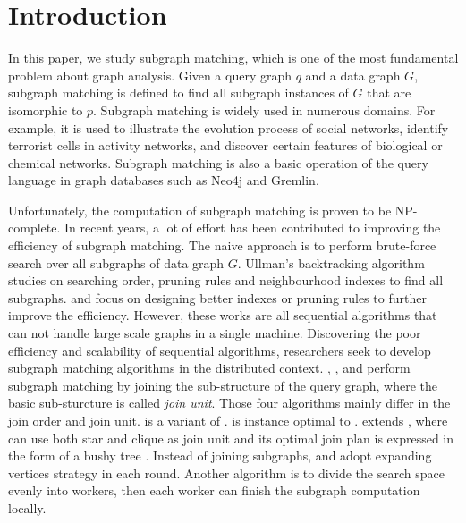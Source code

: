\section{Introduction}
\label{sec:intro}
In this paper, we study subgraph matching, which is one of the most fundamental problem about graph analysis. Given a query graph $q$ and a data graph $G$, subgraph matching is defined to find all subgraph instances of $G$ that are isomorphic to $p$. Subgraph matching is widely used in numerous domains. For example, it is used to illustrate the evolution process of social networks\cite{kairam2012life}, identify terrorist cells in activity networks\cite{cook2006mining}, and discover certain features of biological or chemical networks\cite{Cannataro2010}. Subgraph matching is also a basic operation of the query language in graph databases such as Neo4j\cite{neo4j} and Gremlin\cite{gremlin}.

 Unfortunately, the computation of subgraph matching is proven to be NP-complete\cite{Shamir97}. In recent years, a lot of effort has been contributed to improving the efficiency of subgraph matching. The naive approach is to perform brute-force search over all subgraphs of data graph $G$. Ullman's backtracking algorithm\cite{Ullmann1976} studies on searching order, pruning rules and neighbourhood indexes to find all subgraphs. \vftwo \cite{cordella2004sub} and \quicksi \cite{Shang2008} focus on designing better indexes or pruning rules to further improve the efficiency. However, these works are all sequential algorithms that can not handle large scale graphs in a single machine. Discovering the poor efficiency and scalability of sequential algorithms, researchers seek to develop subgraph matching algorithms in the distributed context.
\psgl \cite{Shao2014}, \starjoin \cite{Sun2012}, \ttjoin \cite{Lai2015} and \cliquejoin \cite{Lai2016} perform subgraph matching by joining the sub-structure of the query graph, where the basic sub-sturcture is called \textit{join unit}. Those four algorithms mainly differ in the join order and join unit. \psgl is a variant of \starjoin. \ttjoin is instance optimal to \starjoin. \cliquejoin extends \starjoin, where \cliquejoin can use both star and clique as join unit and its optimal join plan is expressed in the form of a bushy tree \cite{tree}. Instead of joining subgraphs, \bigjoin \cite{Ammar2018} and \crystaljoin \cite{qiao2017subgraph} adopt expanding vertices strategy in each round. Another algorithm \multiwayjoin \cite{AfratiFU13} is to divide the search space evenly into workers, then each worker can finish the subgraph computation locally. 

